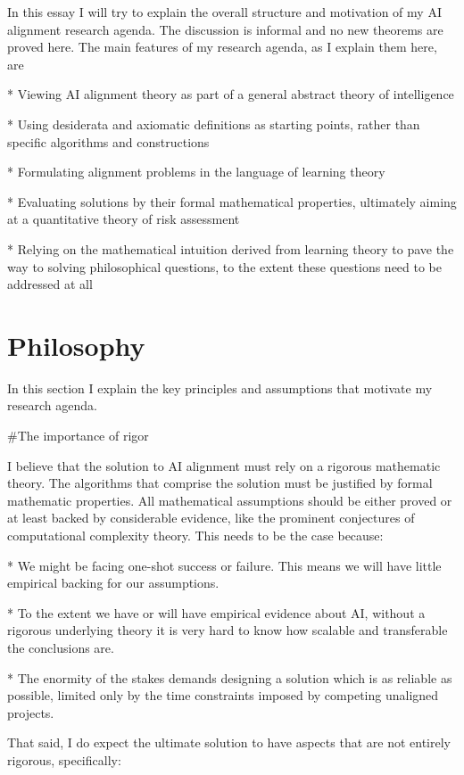 \documentclass[a4paper]{article}
\begin{document}
In this essay I will try to explain the overall structure and motivation of my AI alignment research agenda. The discussion is informal and no new theorems are proved here. The main features of my research agenda, as I explain them here, are 

* Viewing AI alignment theory as part of a general abstract theory of intelligence

* Using desiderata and axiomatic definitions as starting points, rather than specific algorithms and constructions

* Formulating alignment problems in the language of learning theory

* Evaluating solutions by their formal mathematical properties, ultimately aiming at a quantitative theory of risk assessment

* Relying on the mathematical intuition derived from learning theory to pave the way to solving philosophical questions, to the extent these questions need to be addressed at all

\section{Philosophy}

In this section I explain the key principles and assumptions that motivate my research agenda.

\#The importance of rigor

I believe that the solution to AI alignment must rely on a rigorous mathematic theory. The algorithms that comprise the solution must be justified by formal mathematic properties. All mathematical assumptions should be either proved or at least backed by considerable evidence, like the prominent conjectures of computational complexity theory. This needs to be the case because:

* We might be facing one-shot success or failure. This means we will have little empirical backing for our assumptions.

* To the extent we have or will have empirical evidence about AI, without a rigorous underlying theory it is very hard to know how scalable and transferable the conclusions are.

* The enormity of the stakes demands designing a solution which is as reliable as possible, limited only by the time constraints imposed by competing unaligned projects.

That said, I do expect the ultimate solution to have aspects that are not entirely rigorous, specifically:
\end{document}
